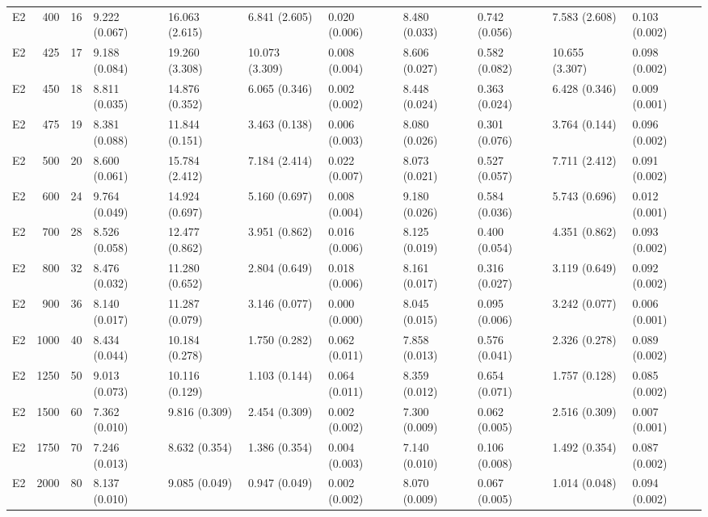 \begin{tabular}{lrrllllllll}
E2 & 400 & 16 & 9.222 (0.067) & 16.063 (2.615) & 6.841 (2.605) & 0.020 (0.006) & 8.480 (0.033) & 0.742 (0.056) & 7.583 (2.608) & 0.103 (0.002) \\
E2 & 425 & 17 & 9.188 (0.084) & 19.260 (3.308) & 10.073 (3.309) & 0.008 (0.004) & 8.606 (0.027) & 0.582 (0.082) & 10.655 (3.307) & 0.098 (0.002) \\
E2 & 450 & 18 & 8.811 (0.035) & 14.876 (0.352) & 6.065 (0.346) & 0.002 (0.002) & 8.448 (0.024) & 0.363 (0.024) & 6.428 (0.346) & 0.009 (0.001) \\
E2 & 475 & 19 & 8.381 (0.088) & 11.844 (0.151) & 3.463 (0.138) & 0.006 (0.003) & 8.080 (0.026) & 0.301 (0.076) & 3.764 (0.144) & 0.096 (0.002) \\
E2 & 500 & 20 & 8.600 (0.061) & 15.784 (2.412) & 7.184 (2.414) & 0.022 (0.007) & 8.073 (0.021) & 0.527 (0.057) & 7.711 (2.412) & 0.091 (0.002) \\
E2 & 600 & 24 & 9.764 (0.049) & 14.924 (0.697) & 5.160 (0.697) & 0.008 (0.004) & 9.180 (0.026) & 0.584 (0.036) & 5.743 (0.696) & 0.012 (0.001) \\
E2 & 700 & 28 & 8.526 (0.058) & 12.477 (0.862) & 3.951 (0.862) & 0.016 (0.006) & 8.125 (0.019) & 0.400 (0.054) & 4.351 (0.862) & 0.093 (0.002) \\
E2 & 800 & 32 & 8.476 (0.032) & 11.280 (0.652) & 2.804 (0.649) & 0.018 (0.006) & 8.161 (0.017) & 0.316 (0.027) & 3.119 (0.649) & 0.092 (0.002) \\
E2 & 900 & 36 & 8.140 (0.017) & 11.287 (0.079) & 3.146 (0.077) & 0.000 (0.000) & 8.045 (0.015) & 0.095 (0.006) & 3.242 (0.077) & 0.006 (0.001) \\
E2 & 1000 & 40 & 8.434 (0.044) & 10.184 (0.278) & 1.750 (0.282) & 0.062 (0.011) & 7.858 (0.013) & 0.576 (0.041) & 2.326 (0.278) & 0.089 (0.002) \\
E2 & 1250 & 50 & 9.013 (0.073) & 10.116 (0.129) & 1.103 (0.144) & 0.064 (0.011) & 8.359 (0.012) & 0.654 (0.071) & 1.757 (0.128) & 0.085 (0.002) \\
E2 & 1500 & 60 & 7.362 (0.010) & 9.816 (0.309) & 2.454 (0.309) & 0.002 (0.002) & 7.300 (0.009) & 0.062 (0.005) & 2.516 (0.309) & 0.007 (0.001) \\
E2 & 1750 & 70 & 7.246 (0.013) & 8.632 (0.354) & 1.386 (0.354) & 0.004 (0.003) & 7.140 (0.010) & 0.106 (0.008) & 1.492 (0.354) & 0.087 (0.002) \\
E2 & 2000 & 80 & 8.137 (0.010) & 9.085 (0.049) & 0.947 (0.049) & 0.002 (0.002) & 8.070 (0.009) & 0.067 (0.005) & 1.014 (0.048) & 0.094 (0.002) \\
\bottomrule
\end{tabular}
